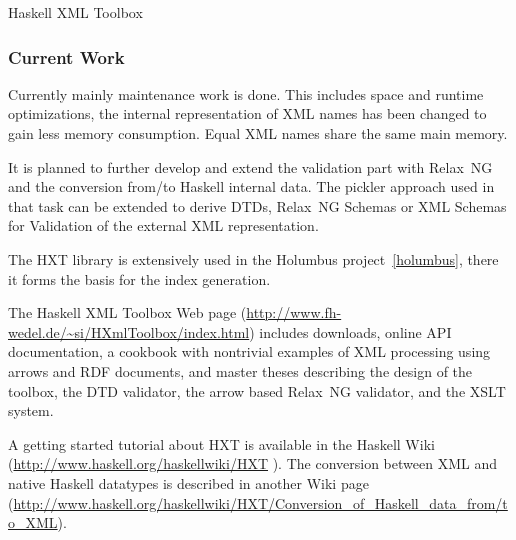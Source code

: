 \begin{hcarentry}[updated]{Haskell XML Toolbox}
\subsubsection*{Current Work}

Currently mainly maintenance work is done. This includes
space and runtime optimizations, the internal representation of XML
names has been changed to gain less memory consumption. Equal XML names
share the same main memory.

It is planned to further develop and extend the validation part with
Relax~NG and the conversion from/to Haskell internal data. The pickler
approach used in that task can be extended to derive DTDs, Relax~NG
Schemas or XML Schemas for Validation of the external XML representation.

The HXT library is extensively used in the Holumbus
project~\cref{holumbus}, there it forms the basis for the index generation.

\FurtherReading
The Haskell XML Toolbox Web page
(\url{http://www.fh-wedel.de/~si/HXmlToolbox/index.html})
includes downloads, online API documentation, a cookbook with nontrivial examples
of XML processing using arrows and RDF documents, and master theses describing the
design of the toolbox, the DTD validator, the arrow based Relax~NG
validator, and the XSLT system.

A getting started tutorial about HXT is available in the Haskell Wiki (\url{http://www.haskell.org/haskellwiki/HXT}
). The conversion between XML and native Haskell datatypes is
described in another Wiki page
(\url{http://www.haskell.org/haskellwiki/HXT/Conversion_of_Haskell_data_from/to_XML}).
\end{hcarentry}
